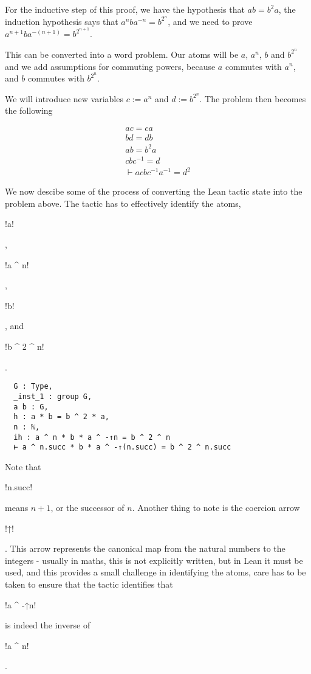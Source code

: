 \documentclass[12pt]{article} %
\theoremstyle{definition}
\theoremstyle{definition}
\theoremstyle{definition}
\theoremstyle{definition}
\theoremstyle{definition}
\theoremstyle{definition}
\begin{document}
For the inductive step of this proof, we have the hypothesis that $ab = b^2a$,
the induction hypothesis says that $a^nba^{-n} = b^{2^n}$,
and we need to prove $a^{n+1}ba^{-(n+1)} = b^{2^{n+1}}$.

This can be converted into a word problem. Our atoms will be
$a$, $a^n$, $b$ and $b^{2^n}$ and we add assumptions for commuting powers,
because $a$ commutes with $a^n$, and $b$ commutes with $b^{2^n}$.

We will introduce new variables $c := a^n$ and $d := b^{2^n}$. The problem
then becomes the following

\begin{equation}\label{problem}
  \begin{aligned}
    ac=ca \\
    bd=db \\
    ab=b^2a \\
    cbc^{-1} = d \\
    \vdash acbc^{-1}a^{-1} = d^2
  \end{aligned}
\end{equation}

We now descibe some of the process of converting the Lean tactic state into the
problem above. The tactic has to effectively identify the atoms,
\begin{lstinline} !a! \end{lstinline}, \begin{lstinline} !a ^ n! \end{lstinline},
\begin{lstinline} !b! \end{lstinline}, and \begin{lstinline} !b ^ 2 ^ n! \end{lstinline}.

\begin{lstlisting}
  G : Type,
  _inst_1 : group G,
  a b : G,
  h : a * b = b ^ 2 * a,
  n : ℕ,
  ih : a ^ n * b * a ^ -↑n = b ^ 2 ^ n
  ⊢ a ^ n.succ * b * a ^ -↑(n.succ) = b ^ 2 ^ n.succ
\end{lstlisting}

Note that \begin{lstinline} !n.succ! \end{lstinline} means $n + 1$, or the
successor of $n$. Another thing to note is the coercion arrow
\begin{lstinline} !↑! \end{lstinline}. This arrow represents the canonical map
from the natural numbers to the integers - usually in maths, this is not explicitly
written, but in Lean it must be used, and this provides a small challenge in
identifying the atoms, care has to be taken to ensure that the tactic identifies
that
\begin{lstinline} !a ^ -↑n! \end{lstinline} is indeed the inverse of
\begin{lstinline} !a ^ n! \end{lstinline}.
\end{document}
